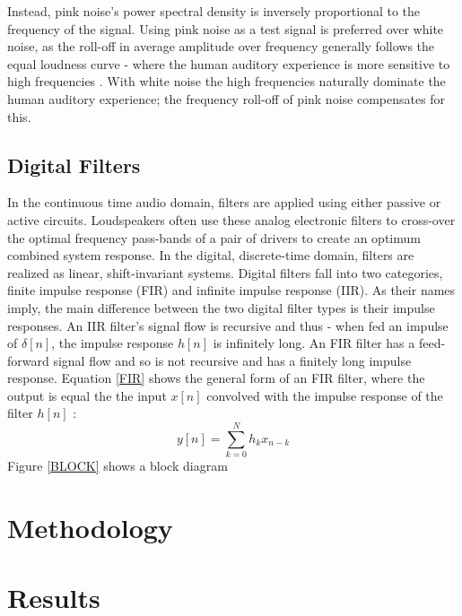 \documentclass[conference]{IEEEtran}
\begin{document}
        Instead, pink noise's power spectral density is inversely proportional to the frequency of the signal.
        Using pink noise as a test signal is preferred over white noise, as the roll-off in average amplitude over frequency generally follows the equal loudness curve - where the human auditory experience is more sensitive to high frequencies \cite{GENELEC}.
        With white noise the high frequencies naturally dominate the human auditory experience; the frequency roll-off of pink noise compensates for this.
        
    \subsection{Digital Filters}
        In the continuous time audio domain, filters are applied using either passive or active circuits.
        Loudspeakers often use these analog electronic filters to cross-over the optimal frequency pass-bands of a pair of drivers to create an optimum combined system response.
        In the digital, discrete-time domain, filters are realized as linear, shift-invariant systems.
        Digital filters fall into two categories, finite impulse response (FIR) and infinite impulse response (IIR).
        As their names imply, the main difference between the two digital filter types is their impulse responses.
        An IIR filter's  signal flow is recursive and thus - when fed an impulse of $\delta[n]$, the impulse response $h[n]$ is infinitely long.
        An FIR filter has a feed-forward signal flow and so is not recursive and has a finitely long impulse response.
        Equation \ref{FIR} shows the general form of an FIR filter, where the output is equal the the input $x[n]$ convolved with the impulse response of the filter $h[n]$ \cite{JORDAN}:
        \begin{equation}\label{FIR}
            y[n] = \sum_{k=0}^N h_k x_{n-k}
        \end{equation}
        Figure \ref{BLOCK} shows a block diagram
\section{Methodology}

\section{Results}



\end{document}
